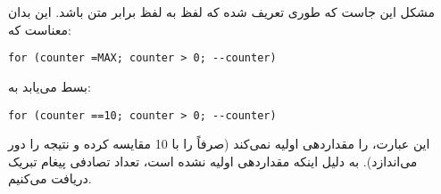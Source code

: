 \section{}
\paragraph{}\label{answer:112}
مشکل این جاست که  طوری تعریف شده که لفظ به لفظ برابر متن  باشد. این بدان معناست که:
\begin{LTR}
    \begin{lstlisting}[style=C++Style]
        for (counter =MAX; counter > 0; --counter)
    \end{lstlisting}
\end{LTR}

بسط می‌یابد به:
\begin{LTR}
    \begin{lstlisting}[style=C++Style]
        for (counter ==10; counter > 0; --counter)
    \end{lstlisting}
\end{LTR}

این عبارت،  را مقداردهی اولیه نمی‌کند (صرفاً  را با 10 مقایسه کرده و نتیجه را دور می‌اندازد). به دلیل اینکه  مقداردهی اولیه نشده است، تعداد تصادفی پیغام تبریک دریافت می‌کنیم.